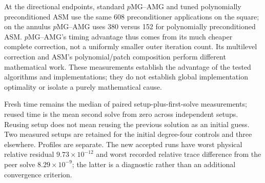 \begin{table}[!htbp]
 \centering\small
 \resizebox{\linewidth}{!}{}
 \caption{Tuned directional endpoints at $p=6$ near one million unknowns.
 Setup/fresh/reused times are seconds; Apply is a separately profiled
 complete application in milliseconds. Both $p$MG--AMG policies are compared with the retuned polynomially preconditioned ASM
 correction, with LU as the baseline. LU cells identify threads; its setup
 uses the fresh-selected count. This supplements the fixed-degree ASM scaling curves.}
 \label{tab:adr-native-tuned}
\end{table}

At the directional endpoints, standard $p$MG--AMG and tuned polynomially preconditioned ASM use the same
608 preconditioner applications on the square; on the annulus $p$MG--AMG uses
380 versus 152 for polynomially preconditioned ASM. $p$MG--AMG's timing advantage thus comes from its much
cheaper complete correction, not a uniformly smaller outer iteration count.
Its multilevel correction and ASM's polynomial/patch composition perform
different mathematical work. These measurements establish the advantage of
the tested algorithms and implementations; they do not establish global
implementation optimality or isolate a purely mathematical cause.

Fresh time remains the median of paired setup-plus-first-solve measurements;
reused time is the mean second solve from zero across independent setups.
Reusing setup does not mean reusing the previous solution as an initial guess.
Two measured setups are retained for the initial degree-four controls and
three elsewhere. Profiles are separate. The new accepted runs have worst
physical relative residual $9.73\times10^{-12}$ and worst recorded relative
trace difference from the peer solve $8.29\times10^{-9}$; the latter is a
diagnostic rather than an additional convergence criterion.
